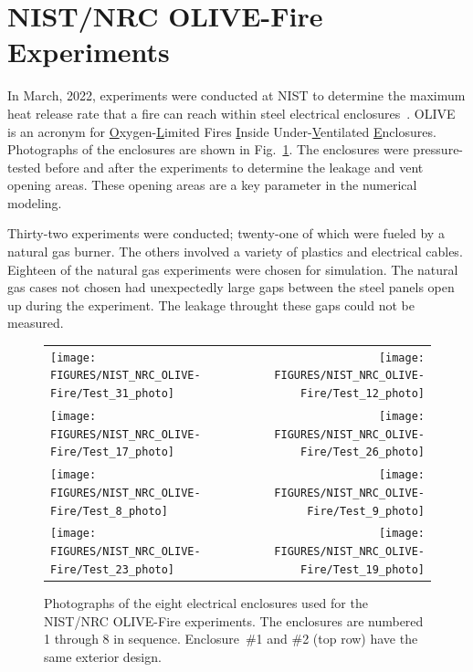 \FloatBarrier

\section{NIST/NRC OLIVE-Fire Experiments}
\label{NIST_NRC_OLIVE-Fire_Description}

In March, 2022, experiments were conducted at NIST to determine the maximum heat release rate that a fire can reach within steel electrical enclosures~\cite{OLIVE-Fire:2022}. OLIVE is an acronym for \underline{O}xygen-\underline{L}imited Fires \underline{I}nside Under-\underline{V}entilated \underline{E}nclosures. Photographs of the enclosures are shown in Fig.~\ref{NIST_NRC_OLIVE_Photos}. The enclosures were pressure-tested before and after the experiments to determine the leakage and vent opening areas. These opening areas are a key parameter in the numerical modeling.

Thirty-two experiments were conducted; twenty-one of which were fueled by a natural gas burner. The others involved a variety of plastics and electrical cables. Eighteen of the natural gas experiments were chosen for simulation. The natural gas cases not chosen had unexpectedly large gaps between the steel panels open up during the experiment. The leakage throught these gaps could not be measured.

\begin{figure}[p]
\begin{tabular*}{\textwidth}{l@{\extracolsep{\fill}}r}
\texttt{[image: FIGURES/NIST\_NRC\_OLIVE-Fire/Test\_31\_photo]} &
\texttt{[image: FIGURES/NIST\_NRC\_OLIVE-Fire/Test\_12\_photo]} \\
\texttt{[image: FIGURES/NIST\_NRC\_OLIVE-Fire/Test\_17\_photo]} &
\texttt{[image: FIGURES/NIST\_NRC\_OLIVE-Fire/Test\_26\_photo]} \\
\texttt{[image: FIGURES/NIST\_NRC\_OLIVE-Fire/Test\_8\_photo]} &
\texttt{[image: FIGURES/NIST\_NRC\_OLIVE-Fire/Test\_9\_photo]} \\
\texttt{[image: FIGURES/NIST\_NRC\_OLIVE-Fire/Test\_23\_photo]} &
\texttt{[image: FIGURES/NIST\_NRC\_OLIVE-Fire/Test\_19\_photo]}
\end{tabular*}
\caption[NIST/NRC OLIVE-Fire enclosure photographs]
{Photographs of the eight electrical enclosures used for the NIST/NRC OLIVE-Fire experiments. The enclosures are numbered 1 through 8 in sequence. Enclosure~\#1 and \#2 (top row) have the same exterior design.}
\label{NIST_NRC_OLIVE_Photos}
\end{figure}

